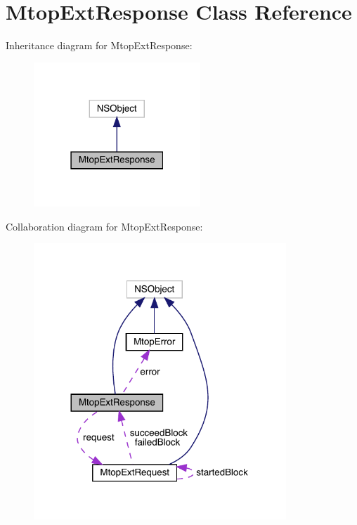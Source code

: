 \hypertarget{interface_mtop_ext_response}{}\section{Mtop\+Ext\+Response Class Reference}
\label{interface_mtop_ext_response}


Inheritance diagram for Mtop\+Ext\+Response\+:\nopagebreak
\begin{figure}[H]
\begin{center}
\leavevmode
\includegraphics[width=178pt]{interface_mtop_ext_response__inherit__graph}
\end{center}
\end{figure}


Collaboration diagram for Mtop\+Ext\+Response\+:\nopagebreak
\begin{figure}[H]
\begin{center}
\leavevmode
\includegraphics[width=269pt]{interface_mtop_ext_response__coll__graph}
\end{center}
\end{figure}
